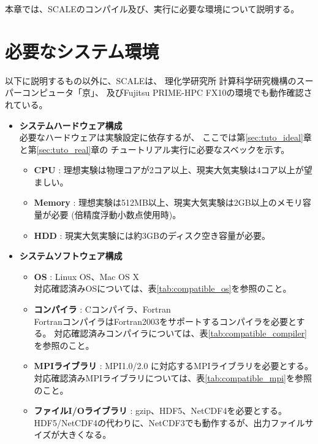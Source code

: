 
本章では、SCALEのコンパイル及び、実行に必要な環境について説明する。

\section{必要なシステム環境}
\label{sec:req_env}

以下に説明するもの以外に、SCALEは、
理化学研究所 計算科学研究機構のスーパーコンピュータ「京」、
及びFujitsu PRIME-HPC FX10の環境でも動作確認されている。\\

\begin{itemize}
  \item {\bf システムハードウェア構成}\\
必要なハードウェアは実験設定に依存するが、
ここでは第\ref{sec:tuto_ideal}章と第\ref{sec:tuto_real}章の
チュートリアル実行に必要なスベックを示す。
  \begin{itemize}
    \item {\bf CPU} : 理想実験は物理コアが2コア以上、現実大気実験は4コア以上が望ましい。
    \item {\bf Memory} : 理想実験は512MB以上、現実大気実験は2GB以上のメモリ容量が必要 (倍精度浮動小数点使用時)。
    \item {\bf HDD} : 現実大気実験には約3GBのディスク空き容量が必要。
  \end{itemize}

  \item {\bf システムソフトウェア構成}
  \begin{itemize}
  \item {\bf OS} : Linux OS、Mac OS X\\
        対応確認済みOSについては、表\ref{tab:compatible_os}を参照のこと。
  \item {\bf コンパイラ} : Cコンパイラ、Fortran\\
        FortranコンパイラはFortran2003をサポートするコンパイラを必要とする。
        対応確認済みコンパイラについては、表\ref{tab:compatible_compiler}を参照のこと。
  \item {\bf MPIライブラリ} : MPI1.0/2.0 に対応するMPIライブラリを必要とする。
        対応確認済みMPIライブラリについては、表\ref{tab:compatible_mpi}を参照のこと。
  \item {\bf ファイルI/Oライブラリ} : gzip、HDF5、NetCDF4を必要とする。\\
        HDF5/NetCDF4の代わりに、NetCDF3でも動作するが、出力ファイルサイズが大きくなる。
  \end{itemize}
\end{itemize}



